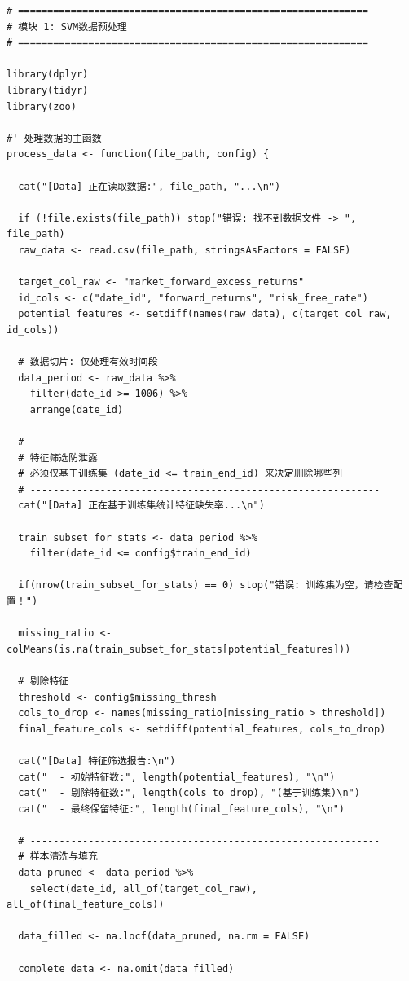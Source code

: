 \documentclass[11pt, a4paper]{article}
\begin{document}
\begin{verbatim}
# ============================================================
# 模块 1: SVM数据预处理
# ============================================================

library(dplyr)
library(tidyr)
library(zoo)

#' 处理数据的主函数
process_data <- function(file_path, config) {
  
  cat("[Data] 正在读取数据:", file_path, "...\n")

  if (!file.exists(file_path)) stop("错误: 找不到数据文件 -> ", file_path)
  raw_data <- read.csv(file_path, stringsAsFactors = FALSE)
  
  target_col_raw <- "market_forward_excess_returns"
  id_cols <- c("date_id", "forward_returns", "risk_free_rate")
  potential_features <- setdiff(names(raw_data), c(target_col_raw, id_cols))
  
  # 数据切片: 仅处理有效时间段
  data_period <- raw_data %>%
    filter(date_id >= 1006) %>%
    arrange(date_id)
  
  # ------------------------------------------------------------
  # 特征筛选防泄露
  # 必须仅基于训练集 (date_id <= train_end_id) 来决定删除哪些列
  # ------------------------------------------------------------
  cat("[Data] 正在基于训练集统计特征缺失率...\n")
  
  train_subset_for_stats <- data_period %>% 
    filter(date_id <= config$train_end_id)
  
  if(nrow(train_subset_for_stats) == 0) stop("错误: 训练集为空，请检查配置！")
  
  missing_ratio <- colMeans(is.na(train_subset_for_stats[potential_features]))
  
  # 剔除特征
  threshold <- config$missing_thresh
  cols_to_drop <- names(missing_ratio[missing_ratio > threshold])
  final_feature_cols <- setdiff(potential_features, cols_to_drop)
  
  cat("[Data] 特征筛选报告:\n")
  cat("  - 初始特征数:", length(potential_features), "\n")
  cat("  - 剔除特征数:", length(cols_to_drop), "(基于训练集)\n")
  cat("  - 最终保留特征:", length(final_feature_cols), "\n")
  
  # ------------------------------------------------------------
  # 样本清洗与填充
  data_pruned <- data_period %>% 
    select(date_id, all_of(target_col_raw), all_of(final_feature_cols))
  
  data_filled <- na.locf(data_pruned, na.rm = FALSE)
  
  complete_data <- na.omit(data_filled)
  

\end{verbatim}
\end{document}
